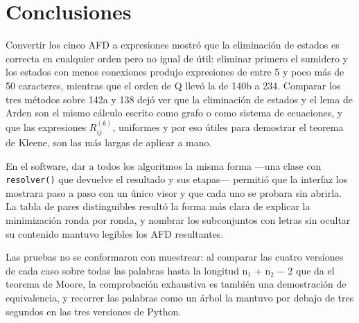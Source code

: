 \hypertarget{conclusiones}{%
\section{Conclusiones}\label{conclusiones}}

Convertir los cinco AFD a expresiones mostró que la eliminación de estados es correcta en cualquier orden pero no igual de útil: eliminar primero el sumidero y los estados con menos conexiones produjo expresiones de entre 5 y poco más de 50 caracteres, mientras que el orden de Q llevó la de 140b a 234. Comparar los tres métodos sobre 142a y 138 dejó ver que la eliminación de estados y el lema de Arden son el mismo cálculo escrito como grafo o como sistema de ecuaciones, y que las expresiones \(R_{ij}^{(k)}\), uniformes y por eso útiles para demostrar el teorema de Kleene, son las más largas de aplicar a mano.

En el software, dar a todos los algoritmos la misma forma ---una clase con \texttt{resolver()} que devuelve el resultado y sus etapas--- permitió que la interfaz los mostrara paso a paso con un único visor y que cada uno se probara sin abrirla. La tabla de pares distinguibles resultó la forma más clara de explicar la minimización ronda por ronda, y nombrar los subconjuntos con letras sin ocultar su contenido mantuvo legibles los AFD resultantes.

Las pruebas no se conformaron con muestrear: al comparar las cuatro versiones de cada caso sobre todas las palabras hasta la longitud n₁ + n₂ − 2 que da el teorema de Moore, la comprobación exhaustiva es también una demostración de equivalencia, y recorrer las palabras como un árbol la mantuvo por debajo de tres segundos en las tres versiones de Python.
